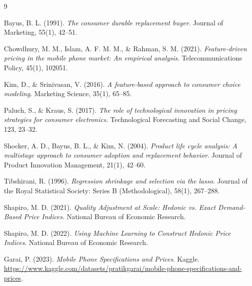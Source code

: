 \documentclass[12pt]{article}
\begin{document}
\begin{thebibliography}{9}

Bayus, B. L. (1991). 
\textit{The consumer durable replacement buyer}. 
Journal of Marketing, 55(1), 42--51.

Chowdhury, M. M., Islam, A. F. M. M., \& Rahman, S. M. (2021). 
\textit{Feature-driven pricing in the mobile phone market: An empirical analysis}. 
Telecommunications Policy, 45(1), 102051.

Kim, D., \& Srinivasan, V. (2016). 
\textit{A feature-based approach to consumer choice modeling}. 
Marketing Science, 35(1), 65--85.

Paluch, S., \& Kraus, S. (2017). 
\textit{The role of technological innovation in pricing strategies for consumer electronics}. 
Technological Forecasting and Social Change, 123, 23--32.

Shocker, A. D., Bayus, B. L., \& Kim, N. (2004). 
\textit{Product life cycle analysis: A multistage approach to consumer adoption and replacement behavior}. 
Journal of Product Innovation Management, 21(1), 42--60.

Tibshirani, R. (1996). 
\textit{Regression shrinkage and selection via the lasso}. 
Journal of the Royal Statistical Society: Series B (Methodological), 58(1), 267--288.

Shapiro, M. D. (2021). 
\textit{Quality Adjustment at Scale: Hedonic vs. Exact Demand-Based Price Indices}. 
National Bureau of Economic Research.

Shapiro, M. D. (2022). 
\textit{Using Machine Learning to Construct Hedonic Price Indices}. 
National Bureau of Economic Research.

Garai, P. (2023). 
\textit{Mobile Phone Specifications and Prices}. 
Kaggle. \url{https://www.kaggle.com/datasets/pratikgarai/mobile-phone-specifications-and-prices}.




\end{thebibliography}
\end{document}
